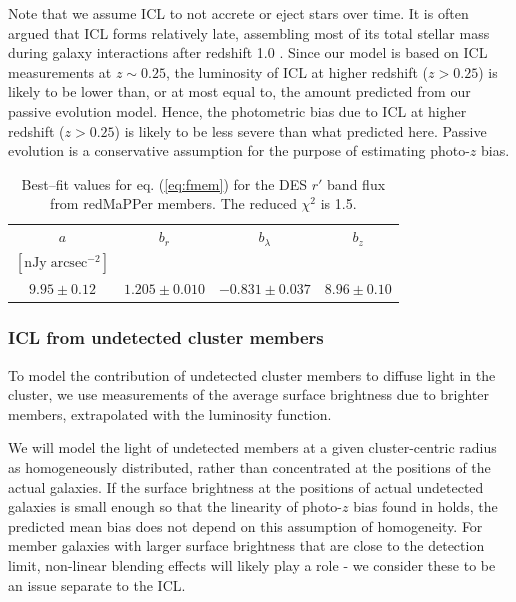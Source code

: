 {Note that we assume ICL to not accrete or eject stars over time. It is often argued that ICL forms relatively late, assembling most of its total stellar mass during galaxy interactions after redshift 1.0 \citep{2006ApJ...652L..89M, 2007ApJ...668..826C, 2012MNRAS.425.2058B, 2013ApJ...770...57B, 2014MNRAS.437.3787C, zhangbcg}. Since our model is based on ICL measurements at $z\sim 0.25$, the luminosity of ICL at higher redshift ($z>0.25$) is likely to be lower than, or at most equal to, the amount predicted from our passive evolution model. Hence, the photometric bias due to ICL at higher redshift ($z>0.25$) is likely to be less severe than what predicted here. Passive evolution is a conservative assumption for the purpose of estimating photo-$z$ bias.

\begin{table}
\centering
\begin{tabular}{cccc}
$a$ & $b_r$ & $b_\lambda$&$b_z$\\
$[\mathrm{nJy}\; \mathrm{arcsec}^{-2}]$ & & & \\
\hline
$ 9.95 \pm 0.12 $ & $ 1.205 \pm 0.010 $ & $-0.831 \pm 0.037$ & $8.96 \pm 0.10$

\end{tabular}\caption{Best--fit values for eq. (\ref{eq:fmem}) for the DES $r'$ band flux from redMaPPer members. The reduced $\chi^2$ is 1.5.}\label{tab:fmem}
\end{table}

\subsubsection{ICL from undetected cluster members}

To model the contribution of undetected cluster members to diffuse light in the cluster, we use measurements of the average surface brightness due to brighter members, extrapolated with the luminosity function. %

We will model the light of undetected members at a given cluster-centric radius as homogeneously distributed, rather than concentrated at the positions of the actual galaxies. If the surface brightness at the positions of actual undetected galaxies is small enough so that the linearity of photo-$z$ bias found in \citet{gruenicl} holds, the predicted mean bias does not depend on this assumption of homogeneity. For member galaxies with larger surface brightness that are close to the detection limit, non-linear blending effects will likely play a role - we consider these to be an issue separate to the ICL.

}
